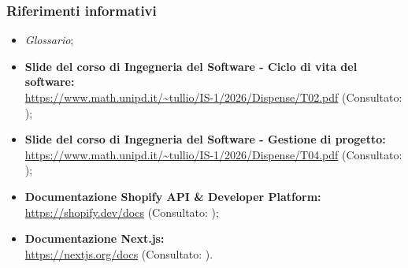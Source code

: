 \subsubsection{Riferimenti informativi}
\begin{itemize}
    \item \textit{Glossario};
    \item \textbf{Slide del corso di Ingegneria del Software - Ciclo di vita del software:} \\
    \url{https://www.math.unipd.it/~tullio/IS-1/2026/Dispense/T02.pdf} (Consultato: );
    \item \textbf{Slide del corso di Ingegneria del Software - Gestione di progetto:} \\
    \url{https://www.math.unipd.it/~tullio/IS-1/2026/Dispense/T04.pdf} (Consultato: );
    \item \textbf{Documentazione Shopify API \& Developer Platform:} \\
    \url{https://shopify.dev/docs} (Consultato: );
    \item \textbf{Documentazione Next.js:} \\
    \url{https://nextjs.org/docs} (Consultato: ).
\end{itemize}